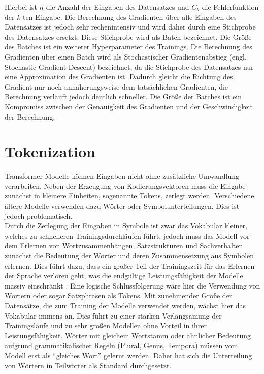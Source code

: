 Hierbei ist $n$ die Anzahl der Eingaben des Datensatzes und $C_k$ die Fehlerfunktion der $k$-ten Eingabe.
Die Berechnung des Gradienten über alle Eingaben des Datensatzes ist jedoch sehr rechenintensiv und wird daher durch eine Stichprobe des Datensatzes ersetzt.
Diese Stichprobe wird als Batch bezeichnet.
Die Größe des Batches ist ein weiterer Hyperparameter des Trainings.
Die Berechnung des Gradienten über einen Batch wird als Stochastischer Gradientenabstieg (engl.
Stochastic Gradient Descent) bezeichnet, da die Stichprobe des Datensatzes nur eine Approximation des Gradienten ist.
Dadurch gleicht die Richtung des Gradient nur noch annäherungsweise dem tatsächlichen Gradienten, die Berechnung verläuft jedoch deutlich schneller.
Die Größe der Batches ist ein Kompromiss zwischen der Genauigkeit des Gradienten und der Geschwindigkeit der Berechnung.\\


\section{Tokenization}\label{sec:tokenization}
Transformer-Modelle können Eingaben nicht ohne zusätzliche Umwandlung verarbeiten.
Neben der Erzeugung von Kodierungsvektoren muss die Eingabe zunächst in kleinere Einheiten, sogenannte Tokens, zerlegt werden.
Verschiedene ältere Modelle verwenden dazu Wörter oder Symbolunterteilungen.
Dies ist jedoch problematisch.\\

Durch die Zerlegung der Eingaben in Symbole ist zwar das Vokabular kleiner, welches zu schnelleren Trainingsdurchläufen führt, jedoch muss das Modell vor dem Erlernen von Wortzusammenhängen, Satzstrukturen und Sachverhalten zunächst die Bedeutung der Wörter und deren Zusammensetzung aus Symbolen erlernen.
Dies führt dazu, dass ein großer Teil der Trainingszeit für das Erlernen der Sprache verloren geht, was die endgültige Leistungsfähigkeit der Modelle massiv einschränkt \citep{bpe}.
Eine logische Schlussfolgerung wäre hier die Verwendung von Wörtern oder sogar Satzphrasen als Tokens.
Mit zunehmender Größe der Datensätze, die zum Training der Modelle verwendet werden, wächst hier das Vokabular immens an.
Dies führt zu einer starken Verlangsamung der Trainingsläufe und zu sehr großen Modellen ohne Vorteil in ihrer Leistungsfähigkeit.
Wörter mit gleichem Wortstamm oder ähnlicher Bedeutung aufgrund grammatikalischer Regeln (Plural, Genus, Tempora) müssen vom Modell erst als \enquote{gleiches Wort} gelernt werden.
Daher hat sich die Unterteilung von Wörtern in Teilwörter als Standard durchgesetzt.

